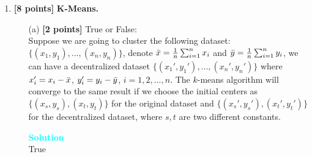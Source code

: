 \documentclass[10pt]{article}
\newenvironment{solution}
    { \begin{mdframed}[backgroundcolor=gray!10] \textcolor{cyan}{\textbf{Solution}} \\}
    {  \end{mdframed}}
\begin{document}
\begin{enumerate}
\begin{itemize}
\begin{solution}
			            False: $k$-means can produce a sub-optimal answer,
			            and it sensitive to the initial position of the centers;
			            it does compute what’s called a ``local optimum''.
		            \end{solution}
		      \item[(g)] The bag-of-words model encodes text as a vector.
		            \begin{solution}
			            True.
		            \end{solution}
		      \item[(h)] A common form of feature engineering on continuous data is one-hot-encoding.
		            \begin{solution}
			            False: One-hot encoding is used for capturing the presence of boolean features.
		            \end{solution}
	      \end{itemize}

	\item \textbf{[8 points]} \textbf{K-Means.}
	      \begin{itemize}
		      \item[(a)] \textbf{[2 points]} True or False: \\
		            Suppose we are going to cluster the following dataset: $\{(x_1, y_1), ..., (x_n, y_n)\}$,
		            denote $\Bar{x} = \frac{1}{n}\sum_{i=1}^n x_i$ and $\Bar{y} = \frac{1}{n}\sum_{i=1}^n y_i$,
		            we can have a decentralized dataset $\{(x_1', y_1'), ..., (x_n', y_n')\}$
		            where $x_i' = x_i - \Bar{x}$, $y_i' = y_i - \Bar{y}$, $i = 1,2,...,n$.
		            The $k$-means algorithm will converge to the same result if we choose the initial
		            centers as $\{(x_s, y_s), (x_t, y_t)\}$ for the original dataset and $\{(x_s', y_s'), (x_t', y_t')\}$
		            for the decentralized dataset, where $s, t$ are two different constants.
		            \begin{solution}
			            True
		            \end{solution}


\end{itemize}
\end{enumerate}
\end{document}
